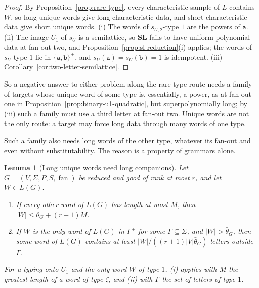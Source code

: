 \documentclass[11pt]{article}
\numberwithin{equation}{section}
\theoremstyle{plain}
\newtheorem{lemma}[theorem]{Lemma}
\theoremstyle{definition}
\theoremstyle{remark}
\newcommand{\fan}{\operatorname{fan}}
\theoremstyle{plain}
\begin{document}
\begin{proof}
By Proposition~\ref{prop:rare-type}, every characteristic sample of $L$ contains
$W$, so long unique words give long characteristic data, and short
characteristic data give short unique words.  (i) The words of $s_{U,2}$-type
$1$ are the powers of $\mathtt a$.  (ii) The image $U_1$ of $s_U$ is a semilattice,
so $\mathbf{SL}$ fails to have uniform polynomial data at fan-out two, and
Proposition~\ref{prop:sl-reduction}(i) applies; the words of $s_U$-type $1$ lie in
$\{\mathtt a,\mathtt b\}^+$, and $s_U(\mathtt a)=s_U(\mathtt b)=1$ is idempotent.  (iii)
Corollary~\ref{cor:two-letter-semilattice}.
\end{proof}

So a negative answer to either problem along the rare-type route needs a family
of targets whose unique word of some type is, essentially, a power, as at fan-out
one in Proposition~\ref{prop:binary-u1-quadratic}, but superpolynomially long; by
(iii) such a family must use a third letter at fan-out two.  Unique words are
not the only route: a target may force long data through many words of one type.

Such a family also needs long words of the other type, whatever its fan-out
and even without substitutability.  The reason is a property of grammars alone.

\begin{lemma}[Long unique words need long companions]
\label{lem:unique-word-gap}
Let $G=(V,\Sigma,P,S,\fan)$ be reduced and good of rank at most $r$, and let
$W\in L(G)$.
\begin{enumerate}[label=\textup{(\roman*)},leftmargin=*]
\item If every other word of $L(G)$ has length at most $M$, then
$|W|\le\bar\theta_G+(r+1)M$.
\item If $W$ is the only word of $L(G)$ in $\Gamma^+$ for some $\Gamma\subseteq\Sigma$,
and $|W|>\bar\theta_G$, then some word of $L(G)$ contains at least
$|W|/((r+1)|V|\bar\theta_G)$ letters outside $\Gamma$.
\end{enumerate}
For a typing onto $U_1$ and the only word $W$ of type $1$, (i) applies with $M$ the
greatest length of a word of type $\zeta$, and (ii) with $\Gamma$ the set of letters
of type $1$.
\end{lemma}
\end{document}
